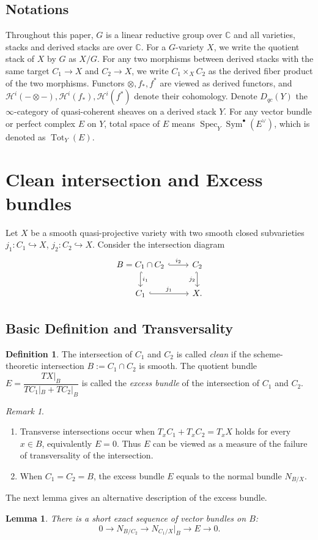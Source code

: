 \documentclass[12pt]{amsart}
\newtheorem{lemma}[theorem]{Lemma}
\theoremstyle{definition}
\newtheorem{definition}[theorem]{Definition}
\theoremstyle{remark}
\newtheorem{remark}[theorem]{Remark}
\numberwithin{equation}{section}
\newcommand{\CC}{\mathbb{C}}
\newcommand{\shH}{\mathcal{H}}
\newcommand{\Spec}{\operatorname{Spec}}
\newcommand{\Sym}{\operatorname{Sym}}
\newcommand{\Tot}{\operatorname{Tot}}
\newcommand{\arw}{\longrightarrow}
\begin{document}
\subsection*{Notations} Throughout this paper, $G$ is a linear reductive group over $\CC$ and all varieties, stacks and derived stacks are over $\CC$. For a $G$-variety $X$, we write the quotient stack of $X$ by $G$ as $X/G$. For any two morphisms between derived stacks with the same target $C_1\arw X$ and $C_2\arw X$, we write $C_1\times_X C_2$ as the derived fiber product of the two morphisms. Functors $\otimes, f_*, f^{*}$ are viewed as derived functors, and $\shH^i(-\otimes-), \shH^i(f_*), \shH^i(f^{*})$ denote their cohomology. Denote $D_{qc}(Y)$ the $\infty$-category of quasi-coherent sheaves on a derived stack $Y$. For any vector bundle or perfect complex $E$ on $Y$, total space of $E$ means $\Spec_Y{\Sym^{\bullet}(E^{\vee})}$, which is denoted as $\Tot_Y(E)$.

\section{Clean intersection and Excess bundles}\label{sec: clean}
Let $X$ be a smooth quasi-projective variety with two smooth closed subvarieties $j_1: C_1\hookrightarrow X$, $j_2: C_2\hookrightarrow X$. Consider the intersection diagram \begin{equation}\label{intdiag} 
\begin{tikzcd}
B=C_1\cap C_2 \arrow[r,hook, "i_2"] \arrow[d,hook,"i_1"]
& C_2 \arrow[d,hook', "j_2"'] \\
 C_1 \arrow[r,hook, "j_1"]
& X.
\end{tikzcd}
 \end{equation}
\subsection{Basic Definition and Transversality}
\begin{definition}
The intersection of $C_1$ and $C_2$ is called \emph{clean} if the scheme-theoretic intersection $B:=C_1\cap C_2$ is smooth. 
The quotient bundle $E=\dfrac{TX|_B}{TC_1|_B+TC_2|_B}$ is called the \emph{excess bundle} of the intersection of $C_1$ and $C_2$.
\end{definition}


\begin{remark}
\begin{enumerate}
    \item Transverse intersections occur when $T_xC_1+T_xC_2=T_xX$ holds for every $x\in B$, equivalently $E=0$. Thus $E$ can be viewed as a measure of the failure of transversality of the intersection.
    \item When $C_1=C_2=B$, the excess bundle $E$ equals to the normal bundle $N_{B/X}$.
\end{enumerate}
 \end{remark}
 The next lemma gives an alternative description of the excess bundle.
\begin{lemma}\label{excess}
   There is a short exact sequence of vector bundles on $B$:
$$0\arw N_{B/C_2}\arw N_{C_1/X}|_B\arw E\arw 0.$$
\end{lemma}
\end{document}
